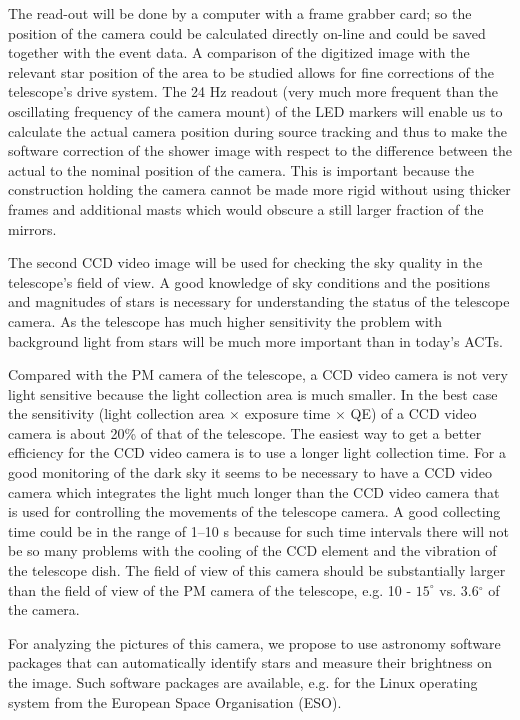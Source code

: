 The read-out will be
done by a computer with a frame grabber card; so the position of the camera
could be calculated directly on-line and could be saved together with the
event data. A comparison of the digitized image with the relevant star
position of the area to be studied allows for fine corrections of the
telescope's drive system. 
The 24 Hz readout (very much more
frequent than the oscillating frequency of the camera mount) 
of the LED markers will enable us
to calculate the actual camera position during source tracking and thus to
make the software correction of the shower image with respect to the
difference between the actual to the nominal position of the camera. This is
important because the construction holding the camera cannot be made more
rigid without using thicker frames and additional masts which would obscure
a still larger fraction of the mirrors.

The second CCD video image will be used for checking the sky quality in the
telescope's field of view. A good knowledge of sky conditions and the
positions and magnitudes of stars is necessary for understanding the status
of the telescope camera. As the telescope has much higher sensitivity the
problem with background light from stars will be much more important than
in today's ACTs.

Compared with the PM camera of the telescope, a CCD video camera is not very
light sensitive because the light collection area is much smaller. In the
best case the sensitivity (light collection area $\times$ exposure time $%
\times$ QE) of a CCD video camera is about 20\% of that of the telescope.
The easiest way to get a better efficiency for the CCD video camera is to
use a longer light collection time. For a good monitoring of the dark sky it
seems to be necessary to have a CCD video camera which integrates the
light much longer than the CCD video camera that is used for controlling the
movements of the telescope camera. A good collecting time could be in the
range of 1--10 s because for such time intervals there will not be so many
problems with the cooling of the CCD element and the vibration of the
telescope dish. The field of view of this camera should be substantially
larger than the field of view of the PM camera of the telescope, e.g. 10 - $%
15^\circ$ vs. 3.6$^\circ$ of the camera.

For analyzing the pictures of this camera, we propose to use astronomy
software packages that can automatically identify stars and measure their
brightness on the image. Such software packages are available, e.g. for the
Linux operating system from the European Space Organisation (ESO).

